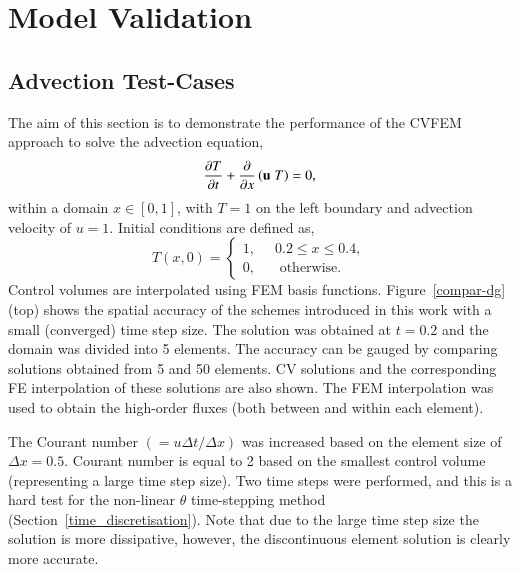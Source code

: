 \documentclass[preprint,authoryear,12pt]{elsarticle}
\begin{document}
\section{Model Validation}\label{Section:Results}%
\subsection{Advection Test-Cases}
The aim of this section is to demonstrate the performance of the CVFEM approach to solve the advection equation, %
\begin{displaymath}
  \displaystyle\frac{\partial T}{\partial t} + \frac{\partial}{\partial x} \left( {\bf u}\;T \right) = 0, 
\end{displaymath}
within a domain $x\in \left[0,1\right]$, with $T=1$ on the left boundary and advection velocity of $u=1$. Initial conditions are defined as,
\begin{displaymath}
  T\left( x,0\right)= \begin{cases} 1, \;\; &  0.2 \le  x \le 0.4, \\
    0, & \mbox{ otherwise.}
  \end{cases}
\end{displaymath}
Control volumes are interpolated using FEM basis functions. Figure~\ref{compar-dg} (top) shows the spatial accuracy of the schemes introduced in this work with a small (converged) time step size. The solution was obtained at $t=0.2$ and the domain was divided into 5 elements. The accuracy can be gauged by comparing solutions obtained from 5 and 50 elements. CV solutions and the corresponding FE interpolation of these solutions are also shown. The FEM interpolation was used to obtain the high-order fluxes (both between and within each element). 

The Courant number $\left(=u\Delta t / \Delta x\right)$ was increased based on the element size of $\Delta x = 0.5$. Courant number is equal to 2 based on the smallest control volume (representing a large time step size). Two time steps were performed, and this is a hard test for the non-linear $\theta$ time-stepping method (Section~\ref{time_discretisation}). Note that due to the large time step size the solution is more dissipative, however, the discontinuous element solution is clearly more accurate. 
\end{document}
